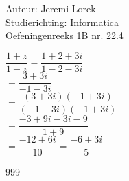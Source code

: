 \documentclass[a4paper]{article}
\begin{document}
  
\noindent \large Auteur: Jeremi Lorek\\
\noindent \large Studierichting: Informatica\\
\noindent \large Oefeningenreeks 1B nr. 22.4\\

\medskip
\normalsize


$\dfrac{1+z}{1-z} = \dfrac{1 + 2 + 3i}{1 - 2 - 3i} $ \\

$= \dfrac{3+3i}{-1-3i}$  \\

$= \dfrac{(3+3i)(-1+3i)}{(-1-3i)(-1+3i)}$  \\

$= \dfrac{-3+9i-3i-9}{1+9}$  \\

$= \dfrac{-12+6i}{10} = \dfrac{-6+3i}{5}$  \\


\begin{thebibliography}{999}
\end{thebibliography}
\end{document}
